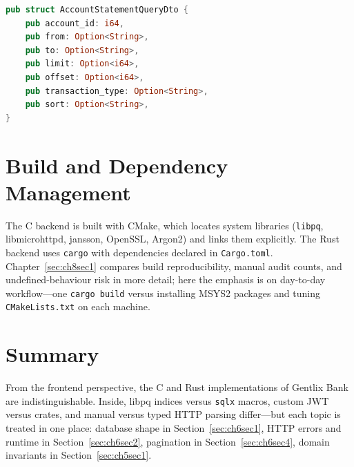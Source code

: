 \begin{lstlisting}[language=Rust, caption={transactions.rs (routes) --- The same
parameters are validated when the handler is type-checked.}]
pub struct AccountStatementQueryDto {
    pub account_id: i64,
    pub from: Option<String>,
    pub to: Option<String>,
    pub limit: Option<i64>,
    pub offset: Option<i64>,
    pub transaction_type: Option<String>,
    pub sort: Option<String>,
}
\end{lstlisting}

\section{Build and Dependency Management}
\label{sec:ch6sec3}

\par The C backend is built with CMake, which locates system libraries (\texttt{libpq}, libmicrohttpd, jansson, OpenSSL, Argon2) and links them explicitly. The Rust backend uses \texttt{cargo} with dependencies declared in \texttt{Cargo.toml}. Chapter~\ref{sec:ch8sec1} compares build reproducibility, manual audit counts, and undefined-behaviour risk in more detail; here the emphasis is on day-to-day workflow---one \texttt{cargo build} versus installing MSYS2 packages and tuning \texttt{CMakeLists.txt} on each machine.

\section*{Summary}

\par From the frontend perspective, the C and Rust implementations of Gentlix Bank are 
indistinguishable. Inside, libpq indices versus \texttt{sqlx} macros, custom JWT versus 
crates, and manual versus typed HTTP parsing differ---but each topic is treated in one 
place: database shape in Section~\ref{sec:ch6sec1}, HTTP errors and runtime in 
Section~\ref{sec:ch6sec2}, pagination in Section~\ref{sec:ch6sec4}, domain invariants 
in Section~\ref{sec:ch5sec1}.
